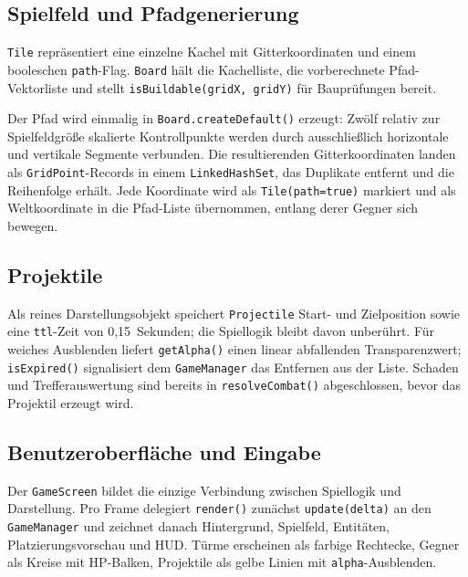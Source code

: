 \subsection{Spielfeld und Pfadgenerierung}

\texttt{Tile} repräsentiert eine einzelne Kachel mit Gitterkoordinaten und
einem booleschen \texttt{path}-Flag. \texttt{Board} hält die Kachelliste,
die vorberechnete Pfad-Vektorliste und stellt \texttt{isBuildable(gridX,~gridY)}
für Bauprüfungen bereit.

Der Pfad wird einmalig in \texttt{Board.createDefault()} erzeugt: Zwölf
relativ zur Spielfeldgröße skalierte Kontrollpunkte werden durch
ausschließlich horizontale und vertikale Segmente verbunden. Die resultierenden
Gitterkoordinaten landen als \texttt{GridPoint}-Records in einem
\texttt{LinkedHashSet}, das Duplikate entfernt und die Reihenfolge erhält. Jede Koordinate wird als
\texttt{Tile(path=true)} markiert und als Weltkoordinate in die Pfad-Liste
übernommen, entlang derer Gegner sich bewegen.

\subsection{Projektile}

Als reines Darstellungsobjekt speichert \texttt{Projectile} Start- und Zielposition
sowie eine \texttt{ttl}-Zeit von 0,15~Sekunden; die Spiellogik bleibt davon
unberührt. Für weiches Ausblenden liefert \texttt{getAlpha()} einen linear
abfallenden Transparenzwert; \texttt{isExpired()}
signalisiert dem \texttt{GameManager} das Entfernen aus der Liste. Schaden und
Trefferauswertung sind bereits in \texttt{resolveCombat()} abgeschlossen,
bevor das Projektil erzeugt wird.

\subsection{Benutzeroberfläche und Eingabe}

Der \texttt{GameScreen} bildet die einzige Verbindung zwischen Spiellogik und
Darstellung. Pro Frame delegiert \texttt{render()} zunächst \texttt{update(delta)} an
den \texttt{GameManager} und zeichnet danach Hintergrund, Spielfeld, Entitäten,
Platzierungsvorschau und HUD. Türme erscheinen als farbige Rechtecke, Gegner
als Kreise mit HP-Balken, Projektile als gelbe Linien mit \texttt{alpha}-Ausblenden.

